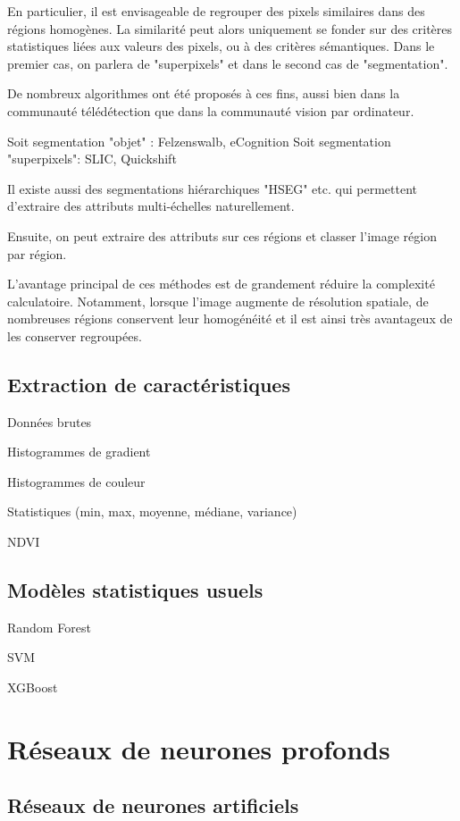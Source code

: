 En particulier, il est envisageable de regrouper des pixels similaires dans des régions homogènes. La similarité peut alors uniquement se fonder sur des critères statistiques liées aux valeurs des pixels, ou à des critères sémantiques. Dans le premier cas, on parlera de "superpixels" et dans le second cas de "segmentation".

De nombreux algorithmes ont été proposés à ces fins, aussi bien dans la communauté télédétection que dans la communauté vision par ordinateur.

Soit segmentation "objet" : Felzenswalb, eCognition
Soit segmentation "superpixels": SLIC, Quickshift

Il existe aussi des segmentations hiérarchiques "HSEG" etc. qui permettent d'extraire des attributs multi-échelles naturellement.

Ensuite, on peut extraire des attributs sur ces régions et classer l'image région par région.

L'avantage principal de ces méthodes est de grandement réduire la complexité calculatoire. Notamment, lorsque l'image augmente de résolution spatiale, de nombreuses régions conservent leur homogénéité et il est ainsi très avantageux de les conserver regroupées.

\subsection{Extraction de caractéristiques}

Données brutes

Histogrammes de gradient

Histogrammes de couleur

Statistiques (min, max, moyenne, médiane, variance)

NDVI

\subsection{Modèles statistiques usuels}

Random Forest

SVM

XGBoost

\section{Réseaux de neurones profonds}

\subsection{Réseaux de neurones artificiels}


